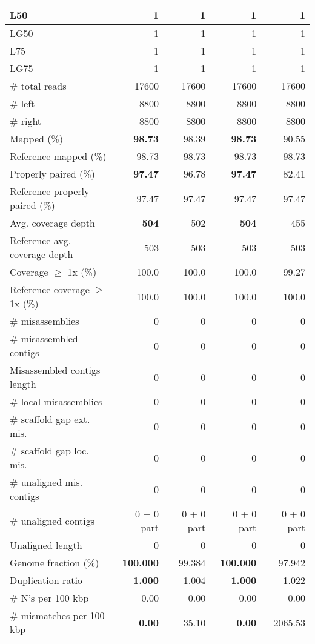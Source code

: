 \documentclass[12pt,a4paper]{article}
\begin{document}
\begin{table}[ht]
\begin{center}
\begin{tabular}{|l*{4}{|r}|}
L50 & 1 & 1 & 1 & 1 \\ \hline
LG50 & 1 & 1 & 1 & 1 \\ \hline
L75 & 1 & 1 & 1 & 1 \\ \hline
LG75 & 1 & 1 & 1 & 1 \\ \hline
\# total reads & 17600 & 17600 & 17600 & 17600 \\ \hline
\# left & 8800 & 8800 & 8800 & 8800 \\ \hline
\# right & 8800 & 8800 & 8800 & 8800 \\ \hline
Mapped (\%) & {\bf 98.73} & 98.39 & {\bf 98.73} & 90.55 \\ \hline
Reference mapped (\%) & 98.73 & 98.73 & 98.73 & 98.73 \\ \hline
Properly paired (\%) & {\bf 97.47} & 96.78 & {\bf 97.47} & 82.41 \\ \hline
Reference properly paired (\%) & 97.47 & 97.47 & 97.47 & 97.47 \\ \hline
Avg. coverage depth & {\bf 504} & 502 & {\bf 504} & 455 \\ \hline
Reference avg. coverage depth & 503 & 503 & 503 & 503 \\ \hline
Coverage $\geq$ 1x (\%) & 100.0 & 100.0 & 100.0 & 99.27 \\ \hline
Reference coverage $\geq$ 1x (\%) & 100.0 & 100.0 & 100.0 & 100.0 \\ \hline
\# misassemblies & 0 & 0 & 0 & 0 \\ \hline
\# misassembled contigs & 0 & 0 & 0 & 0 \\ \hline
Misassembled contigs length & 0 & 0 & 0 & 0 \\ \hline
\# local misassemblies & 0 & 0 & 0 & 0 \\ \hline
\# scaffold gap ext. mis. & 0 & 0 & 0 & 0 \\ \hline
\# scaffold gap loc. mis. & 0 & 0 & 0 & 0 \\ \hline
\# unaligned mis. contigs & 0 & 0 & 0 & 0 \\ \hline
\# unaligned contigs & 0 + 0 part & 0 + 0 part & 0 + 0 part & 0 + 0 part \\ \hline
Unaligned length & 0 & 0 & 0 & 0 \\ \hline
Genome fraction (\%) & {\bf 100.000} & 99.384 & {\bf 100.000} & 97.942 \\ \hline
Duplication ratio & {\bf 1.000} & 1.004 & {\bf 1.000} & 1.022 \\ \hline
\# N's per 100 kbp & 0.00 & 0.00 & 0.00 & 0.00 \\ \hline
\# mismatches per 100 kbp & {\bf 0.00} & 35.10 & {\bf 0.00} & 2065.53 \\ \hline

\end{tabular}
\end{center}
\end{table}
\end{document}
